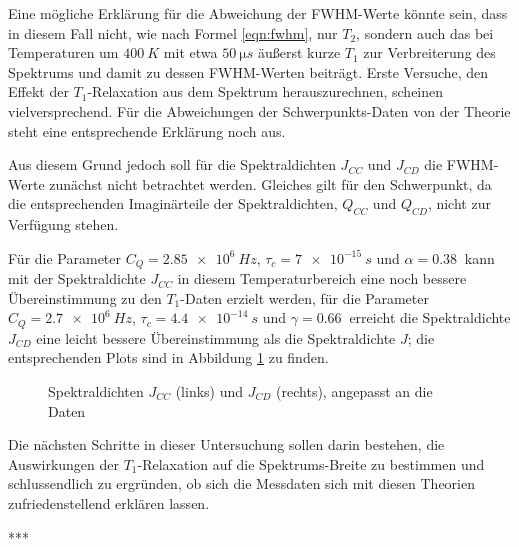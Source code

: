 Eine mögliche Erklärung für die Abweichung der FWHM-Werte könnte sein, dass in diesem Fall nicht, wie nach Formel \eqref{eqn:fwhm}, nur $T_2$, sondern auch das bei Temperaturen um $\SI{400}{K}$ mit etwa $\SI{50}{\micro s}$ äußerst kurze $T_1$ zur Verbreiterung des Spektrums und damit zu dessen FWHM-Werten beiträgt. Erste Versuche, den Effekt der $T_1$-Relaxation aus dem Spektrum herauszurechnen, scheinen vielversprechend. Für die Abweichungen der Schwerpunkts-Daten von der Theorie steht eine entsprechende Erklärung noch aus.

Aus diesem Grund jedoch soll für die Spektraldichten $J_{CC}$ und $J_{CD}$ die FWHM-Werte zunächst nicht betrachtet werden. Gleiches gilt für den Schwerpunkt, da die entsprechenden Imaginärteile der Spektraldichten, $Q_{CC}$ und $Q_{CD}$, nicht zur Verfügung stehen.

Für die Parameter $C_Q = \SI{2.85e6}{Hz}$, $\tau_c = \SI{7e-15}{s}$ und $\alpha = \SI{0.38}{}$ kann mit der Spektraldichte $J_{CC}$ in diesem Temperaturbereich eine noch bessere Übereinstimmung zu den $T_1$-Daten erzielt werden, für die Parameter $C_Q = \SI{2.7e6}{Hz}$, $\tau_c = \SI{4.4e-14}{s}$ und $\gamma = \SI{0.66}{}$ erreicht die Spektraldichte $J_{CD}$ eine leicht bessere Übereinstimmung als die Spektraldichte $J$; die entsprechenden Plots sind in Abbildung \ref{fig:j_cc_j_cd} zu finden.
\begin{figure}[H]
	\centering
	\begin{subfigure}{0.49\textwidth}
		\centering
	\end{subfigure}%
	\begin{subfigure}{0.49\textwidth}
		\centering
	\end{subfigure}
	\caption{Spektraldichten $J_{CC}$ (links) und $J_{CD}$ (rechts), angepasst an die Daten}
	\label{fig:j_cc_j_cd}
\end{figure}

Die nächsten Schritte in dieser Untersuchung sollen darin bestehen, die Auswirkungen der $T_1$-Relaxation auf die Spektrums-Breite zu bestimmen und schlussendlich zu ergründen, ob sich die Messdaten sich mit diesen Theorien zufriedenstellend erklären lassen.











***

